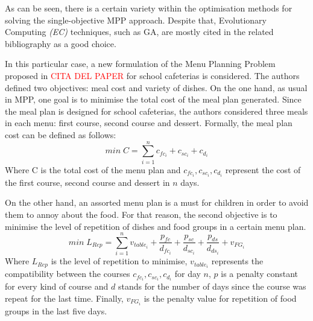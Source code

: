 As can be seen, there is a certain variety within the optimisation methods for solving the single-objective MPP approach. Despite that, Evolutionary Computing \textit{(EC)} techniques, such as GA, are mostly cited in the related bibliography as a good choice\cite{Ngo2016, Seljak2009, Moreira2018}. 

In this particular case, a new formulation of the Menu Planning Problem proposed in \textcolor{red}{CITA DEL PAPER} for school cafeterias is considered. The authors defined two objectives: meal cost and variety of dishes.
On the one hand, as usual in MPP, one goal is to minimise the total cost of the meal plan generated. Since the meal plan is designed for school cafeterias, the authors considered three meals in each menu: first course, second course and dessert. Formally, the meal plan cost can be defined as follows:
\[
    min\; C = \sum_{i=1}^{n}{c_{fc_{i}} + c_{sc_{i}} + c_{d_{i}}}
\]
Where C is the total cost of the menu plan and $c_{fc_{i}}, c_{sc_{i}}, c_{d_{i}}$ represent the cost of the first course, second course and dessert in $n$ days.

On the other hand, an assorted menu plan is a must for children in order to avoid them to annoy about the food. For that reason, the second objective is to minimise the level of repetition of dishes and food groups in a certain menu plan. 
\[
    min\; L_{Rep} = \sum_{i=1}^{n}{v_{table_{i}} + \frac{p_{fc}}{d_{fc_{i}}} + \frac{p_{sc}}{d_{sc_{i}}} + \frac{p_{ds}}{d_{ds_{i}}} + v_{FG_{i}}}
\]
Where $L_{Rep}$ is the level of repetition to minimise, $v_{table_{i}}$ represents the compatibility between the courses $c_{fc_{i}}, c_{sc_{i}}, c_{d_{i}}$ for day $n$, $p$ is a penalty constant for every kind of course and $d$ stands for the number of days since the course was repeat for the last time. Finally, $v_{FG_{i}}$ is the penalty value for repetition of food groups in the last five days.

